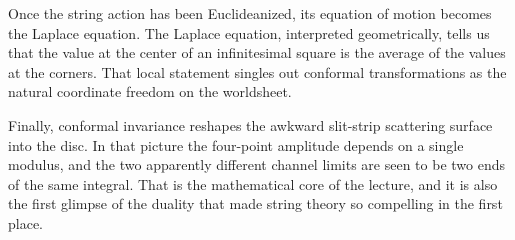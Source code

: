 Once the string action has been Euclideanized, its equation of motion becomes the Laplace equation. The Laplace equation, interpreted geometrically, tells us that the value at the center of an infinitesimal square is the average of the values at the corners. That local statement singles out conformal transformations as the natural coordinate freedom on the worldsheet.

Finally, conformal invariance reshapes the awkward slit-strip scattering surface into the disc. In that picture the four-point amplitude depends on a single modulus, and the two apparently different channel limits are seen to be two ends of the same integral. That is the mathematical core of the lecture, and it is also the first glimpse of the duality that made string theory so compelling in the first place.